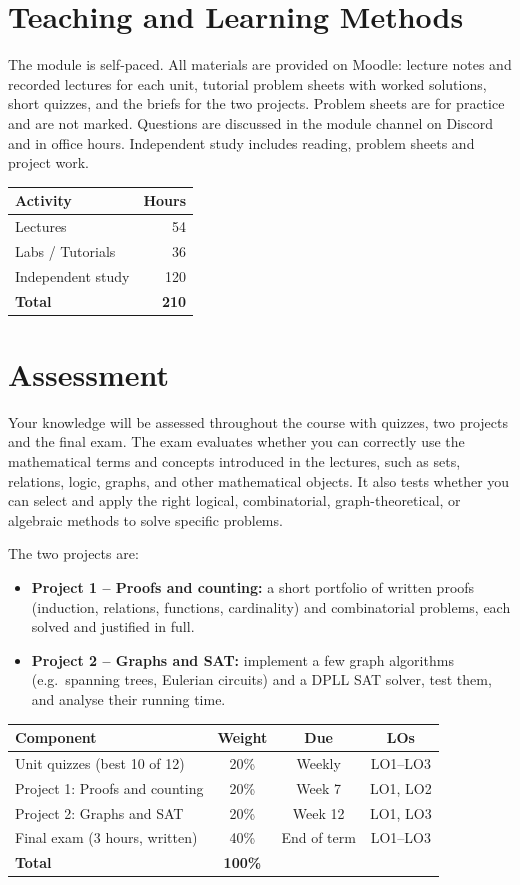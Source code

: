 \documentclass[11pt,a4paper]{article}
\begin{document}
\section{Teaching and Learning Methods}
The module is self-paced. All materials are provided on Moodle: lecture notes and
recorded lectures for each unit, tutorial problem sheets with worked solutions,
short quizzes, and the briefs for the two projects. Problem sheets are for practice
and are not marked. Questions are discussed in the module channel on Discord and in
office hours. Independent study includes reading, problem sheets and project work.

\begin{tabularx}{0.6\textwidth}{X r}
\toprule
\textbf{Activity} & \textbf{Hours} \\
\midrule
Lectures            & 54 \\
Labs / Tutorials    & 36 \\
Independent study   & 120 \\
\midrule
\textbf{Total}      & \textbf{210} \\
\bottomrule
\end{tabularx}

\section{Assessment}
Your knowledge will be assessed throughout the course with quizzes, two projects and the
final exam. The exam evaluates whether you can correctly use the mathematical terms and
concepts introduced in the lectures, such as sets, relations, logic, graphs, and
other mathematical objects. It also tests whether you can select and apply the
right logical, combinatorial, graph-theoretical, or algebraic methods to solve
specific problems.

The two projects are:
\begin{itemize}
  \item \textbf{Project 1 -- Proofs and counting:} a short portfolio of written
        proofs (induction, relations, functions, cardinality) and combinatorial
        problems, each solved and justified in full.
  \item \textbf{Project 2 -- Graphs and SAT:} implement a few graph algorithms
        (e.g.\ spanning trees, Eulerian circuits) and a DPLL SAT solver, test them,
        and analyse their running time.
\end{itemize}

\begin{tabularx}{\textwidth}{X c c c}
\toprule
\textbf{Component} & \textbf{Weight} & \textbf{Due} & \textbf{LOs} \\
\midrule
Unit quizzes (best 10 of 12) & 20\% & Weekly & LO1--LO3 \\
Project 1: Proofs and counting & 20\% & Week 7 & LO1, LO2 \\
Project 2: Graphs and SAT & 20\% & Week 12 & LO1, LO3 \\
Final exam (3 hours, written) & 40\% & End of term & LO1--LO3 \\
\midrule
\textbf{Total}      & \textbf{100\%} & & \\
\bottomrule
\end{tabularx}
\end{document}
